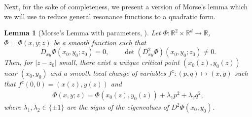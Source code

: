 \documentclass[%
11pt,  reqno]{amsart}
\newcommand{\5}{\textup{V}}
\newcommand{\m}[1]{
	\ifdefequal{#1}{1}
	{\mathbbm{#1}}
	{\mathbb{#1}}
}
\newtheorem{lemma}[theorem]{Lemma}
\theoremstyle{remark}
\newcommand{\R}{\mathbb{R}}
\newcommand{\ld}{\lambda}
\numberwithin{equation}{section}
\numberwithin{theorem}{section}
\begin{document}
		
        
            
            

        
         {
     
		Next, for the sake of completeness, we present a version of Morse's lemma which we will use to reduce general resonance functions to a quadratic form.
		
		\begin{lemma}[Morse's Lemma with parameters, {\cite[Lemma C.6.1]{Hormander}}]
			\label{LEM:morse}
		Let $\Phi: \R^2\times \R^d \to \R$, $\Phi=\Phi(x,y;z)$ be a smooth function such that 
        $$D_{xy} \Phi(x_0,y_0;z_0) = 0,\qquad\det(D^2_{xy} \Phi)(x_0,y_0;z_0) \ne 0.$$
Then, for $|z-z_0|$ small, there exist a unique critical point $(x_0(z),y_0(z))$ near $(x_0,y_0)$ and  a smooth local change of variables $f^z: (p,q) \mapsto (x,y) $ such that $f^z(0,0) = (x(z),y(z))$ and 
\begin{align}
\Phi(x,y;z) = \Phi(x_0(z), y_0(z)) + \ld_1 p^2 + \ld_2 q^2, 
\end{align}
where $\ld_1,\ld_2 \in \{\pm1\}$ are the signs of the eigenvalues of $D^2\Phi(x_0,y_0)$. 
		\end{lemma}
		

        }
\end{document}

